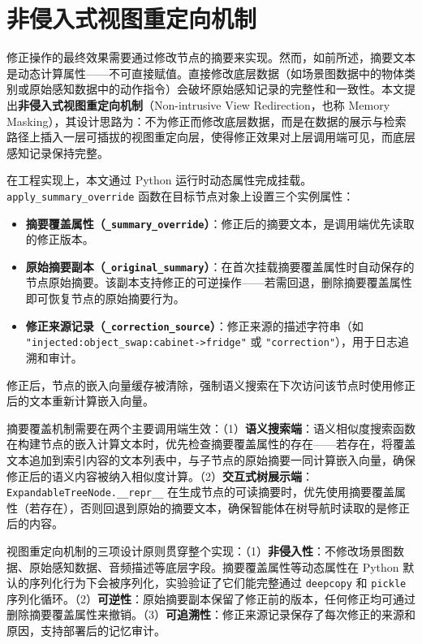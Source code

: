 \section{非侵入式视图重定向机制}

修正操作的最终效果需要通过修改节点的摘要来实现。然而，如前所述，摘要文本是动态计算属性——不可直接赋值。直接修改底层数据（如场景图数据中的物体类别或原始感知数据中的动作指令）会破坏原始感知记录的完整性和一致性。本文提出\textbf{非侵入式视图重定向机制}（Non-intrusive View Redirection，也称 Memory Masking），其设计思路为：不为修正而修改底层数据，而是在数据的展示与检索路径上插入一层可插拔的视图重定向层，使得修正效果对上层调用端可见，而底层感知记录保持完整。

在工程实现上，本文通过 Python 运行时动态属性完成挂载。\texttt{apply\_summary\_override} 函数在目标节点对象上设置三个实例属性：

\begin{itemize}
\item \textbf{摘要覆盖属性（\texttt{\_summary\_override}）}：修正后的摘要文本，是调用端优先读取的修正版本。
\item \textbf{原始摘要副本（\texttt{\_original\_summary}）}：在首次挂载摘要覆盖属性时自动保存的节点原始摘要。该副本支持修正的可逆操作——若需回退，删除摘要覆盖属性即可恢复节点的原始摘要行为。
\item \textbf{修正来源记录（\texttt{\_correction\_source}）}：修正来源的描述字符串（如 \texttt{"injected:object\_swap:cabinet->fridge"} 或 \texttt{"correction"}），用于日志追溯和审计。
\end{itemize}

修正后，节点的嵌入向量缓存被清除，强制语义搜索在下次访问该节点时使用修正后的文本重新计算嵌入向量。

摘要覆盖机制需要在两个主要调用端生效：（1）\textbf{语义搜索端}：语义相似度搜索函数在构建节点的嵌入计算文本时，优先检查摘要覆盖属性的存在——若存在，将覆盖文本追加到索引内容的文本列表中，与子节点的原始摘要一同计算嵌入向量，确保修正后的语义内容被纳入相似度计算。（2）\textbf{交互式树展示端}：\texttt{ExpandableTreeNode.\_\_repr\_\_} 在生成节点的可读摘要时，优先使用摘要覆盖属性（若存在），否则回退到原始的摘要文本，确保智能体在树导航时读取的是修正后的内容。

视图重定向机制的三项设计原则贯穿整个实现：（1）\textbf{非侵入性}：不修改场景图数据、原始感知数据、音频描述等底层字段。摘要覆盖属性等动态属性在 Python 默认的序列化行为下会被序列化，实验验证了它们能完整通过 \texttt{deepcopy} 和 \texttt{pickle} 序列化循环。（2）\textbf{可逆性}：原始摘要副本保留了修正前的版本，任何修正均可通过删除摘要覆盖属性来撤销。（3）\textbf{可追溯性}：修正来源记录保存了每次修正的来源和原因，支持部署后的记忆审计。

